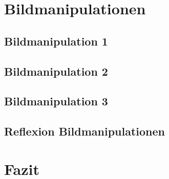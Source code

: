 \documentclass[11pt]{article}
\begin{document}
    \section{Bildmanipulationen}

    \subsection{Bildmanipulation 1}

    \subsection{Bildmanipulation 2}

    \subsection{Bildmanipulation 3}

    \subsection{Reflexion Bildmanipulationen}

    \section{Fazit}
\end{document}
